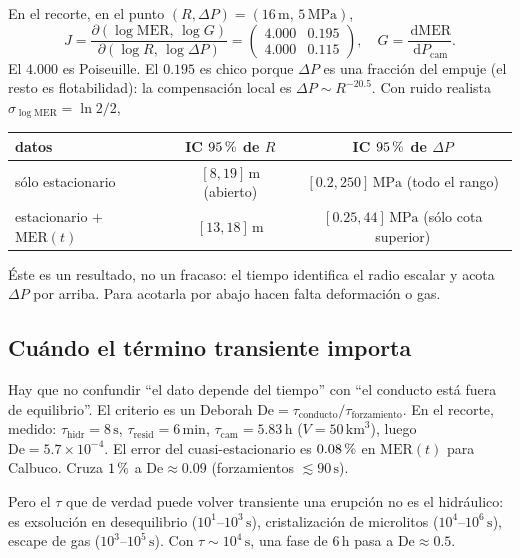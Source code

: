 \documentclass[11pt,a4paper]{article}
\theoremstyle{plain}
\theoremstyle{definition}
\theoremstyle{remark}
\newcommand{\pc}{\ifmmode\text{\,\%}\else\,\%\fi}
\newcommand{\MER}{\mathrm{MER}}
\newcommand{\dd}{\,\mathrm{d}}
\newcommand{\p}{\partial}
\begin{document}
En el recorte, en el punto $(R,\Delta P)=(16\,\mathrm{m},\,5\,\mathrm{MPa})$,
\[
J
=\frac{\p(\log\MER,\,\log G)}{\p(\log R,\,\log\Delta P)}
=\begin{pmatrix}4.000&0.195\\4.000&0.115\end{pmatrix},
\quad
G=\frac{\dd\MER}{\dd P_{\mathrm{cam}}}.
\]
El $4.000$ es Poiseuille. El $0.195$ es chico porque $\Delta P$ es
una fracción del empuje (el resto es flotabilidad): la compensación
local es $\Delta P\sim R^{-20.5}$. Con ruido realista
$\sigma_{\log\MER}=\ln 2/2$,

\begin{center}
\small
\begin{tabular}{@{}lcc@{}}
\toprule
datos & IC $95\pc$ de $R$ & IC $95\pc$ de $\Delta P$ \\
\midrule
sólo estacionario & $[8,19]\,\mathrm{m}$ (abierto)
  & $[0.2,250]\,\mathrm{MPa}$ (todo el rango) \\
estacionario + $\MER(t)$ & $[13,18]\,\mathrm{m}$
  & $[0.25,44]\,\mathrm{MPa}$ (sólo cota superior) \\
\bottomrule
\end{tabular}
\end{center}

Éste es un resultado, no un fracaso: el tiempo identifica el radio
escalar y acota $\Delta P$ por arriba. Para acotarla por abajo hacen
falta deformación o gas.

\subsection{Cuándo el término transiente importa}

Hay que no confundir ``el dato depende del tiempo'' con ``el
conducto está fuera de equilibrio''. El criterio es un Deborah
$\mathrm{De}=\tau_{\mathrm{conducto}}/\tau_{\mathrm{forzamiento}}$.
En el recorte, medido: $\tau_{\mathrm{hidr}}=8\,\mathrm{s}$,
$\tau_{\mathrm{resid}}=6\,\mathrm{min}$,
$\tau_{\mathrm{cam}}=5.83\,\mathrm{h}$ ($V=50\,\mathrm{km}^3$),
luego $\mathrm{De}=5.7\times10^{-4}$. El error del
cuasi-estacionario es $0.08\pc$ en $\MER(t)$ para Calbuco. Cruza
$1\pc$ a $\mathrm{De}\approx 0.09$ (forzamientos $\lesssim 90\,\mathrm{s}$).

Pero el $\tau$ que de verdad puede volver transiente una erupción
no es el hidráulico: es exsolución en desequilibrio
($10^1$--$10^3\,\mathrm{s}$), cristalización de microlitos
($10^4$--$10^6\,\mathrm{s}$), escape de gas
($10^3$--$10^5\,\mathrm{s}$). Con $\tau\sim10^4\,\mathrm{s}$, una
fase de $6\,\mathrm{h}$ pasa a $\mathrm{De}\approx 0.5$.
\end{document}
